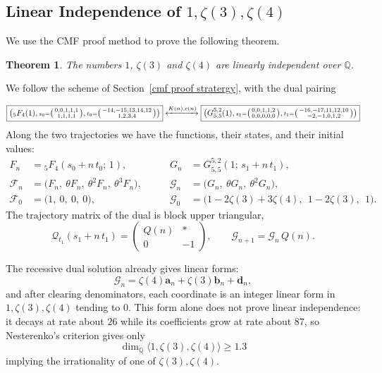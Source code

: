 \documentclass[oneside,english,11pt]{amsart}
\newtheorem{theorem}[thm]{Theorem}
\begin{document}
\subsection{Linear Independence of
\texorpdfstring{$1,\zeta(3),\zeta(4)$}{1, ζ(3), ζ(4)}}
\label{subsec:z34}
We use the CMF proof method to prove the following theorem.

\begin{theorem}\label{thm:z34}
The numbers $1$, $\zeta(3)$ and $\zeta(4)$ are linearly independent over $\mathbb Q$.
\end{theorem}

We follow the scheme of Section~\ref{cmf proof stratergy}, with the dual
pairing

{\setlength{\fboxsep}{2pt}%
\[
  \boxed{\bigl({}_5F_4(1),{\scriptstyle s_0=}\bigl(\begin{smallmatrix}0,0,1,1,1\\1,1,1,1\end{smallmatrix}\bigr),
         {\scriptstyle t_0=}\bigl(\begin{smallmatrix}-14,-15,13,14,12\\1,2,3,4\end{smallmatrix}\bigr)\bigr)}
  \xleftrightarrow{K(n),c(n)}
  \boxed{\bigl(G^{5,2}_{5,5}(1),{\scriptstyle s_1=}\bigl(\begin{smallmatrix}0,0,1,1,2\\0,0,0,0,0\end{smallmatrix}\bigr),
         {\scriptstyle t_1=}\bigl(\begin{smallmatrix}-16,-17,11,12,10\\-2,-1,0,1,2\end{smallmatrix}\bigr)\bigr)}
\]}
Along the two trajectories we have the functions, their states, and their
initial values:
\[
\begin{aligned}
  F_n&={}_5F_4(s_0+n\,t_0;\,1),
  &\qquad
  G_n&=G^{5,2}_{5,5}(1;\,s_1+n\,t_1),\\[2pt]
  \mathcal F_n&=\bigl(F_n,\ \theta F_n,\ \theta^2F_n,\ \theta^3F_n\bigr),
  &\qquad
  \mathcal G_n&=\bigl(G_n,\ \theta G_n,\ \theta^2G_n\bigr),\\[2pt]
  \mathcal F_0&=\bigl(1,\ 0,\ 0,\ 0\bigr),
  &\qquad
  \mathcal G_0&=\bigl(1-2\zeta(3)+3\zeta(4),\ \ 1-2\zeta(3),\ \ 1\bigr).
\end{aligned}
\]
The trajectory matrix of the dual is block upper triangular,
\[
  \mathcal Q_{t_1}(s_1+n\,t_1)=\begin{pmatrix}Q(n)&*\\0&-1\end{pmatrix},
  \qquad
  \mathcal G_{n+1}=\mathcal G_n\,Q(n).
\]
\begin{remark}\label{rem:z34-type-one}
The recessive dual solution already gives linear forms: 
\[
  \mathcal G_n=\zeta(4)\mathbf a_n+\zeta(3)\mathbf b_n+\mathbf d_n ,
\]
and after clearing denominators, each coordinate is an integer linear form in $1,\zeta(3),\zeta(4)$ tending to $0$.
This form alone does not prove linear independence: it decays at rate about $26$ while its coefficients grow at rate about $87$, so Nesterenko's criterion \cite{Nesterenko85} gives only
\[
\dim_{\mathbb Q}\langle1,\zeta(3),\zeta(4)\rangle\ge1.3\]
implying the irrationality of one of $\zeta(3),\zeta(4)$.
\end{remark}
\end{document}
